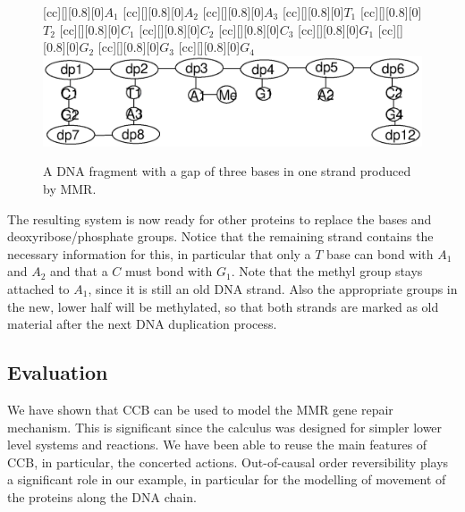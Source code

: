 \begin{figure}[]
[cc][][0.8][0]{${A_1}$}
[cc][][0.8][0]{${A_2}$}
[cc][][0.8][0]{${A_3}$}
[cc][][0.8][0]{${T_1}$}
[cc][][0.8][0]{${T_2}$}
[cc][][0.8][0]{${C_1}$}
[cc][][0.8][0]{${C_2}$}
[cc][][0.8][0]{${C_3}$}
[cc][][0.8][0]{${G_1}$}
[cc][][0.8][0]{${G_2}$}
[cc][][0.8][0]{${G_3}$}
[cc][][0.8][0]{${G_4}$}
  \centering
    \includegraphics[width=1.0\textwidth]{mmr/state7}\vspace{-1cm}
  \caption[A six base pair DNA fragment.]{A DNA fragment with a gap of three bases in one strand produced by MMR.}
  \label{fig:state7}
\end{figure}
The resulting system is now ready for other proteins to replace the bases and deoxyribose/phosphate groups. Notice that the remaining strand contains the necessary information for this, in particular that only a $T$ base can bond with $A_1$ and $A_2$ and that a $C$ must bond with $G_1$. Note that the methyl group stays attached to $A_1$, since it is still an old DNA strand. Also the appropriate groups in the new, lower half will be methylated, so that both strands are marked as old material after the next DNA duplication process.

\subsection{Evaluation}

We have shown that CCB can be used to model the MMR gene repair mechanism. This is significant since the calculus was designed for simpler lower level systems and reactions. We have been able to reuse the main features of CCB, in particular, the concerted actions. Out-of-causal order reversibility plays a significant role in our example, in particular for the modelling of movement of the proteins along the DNA chain.

